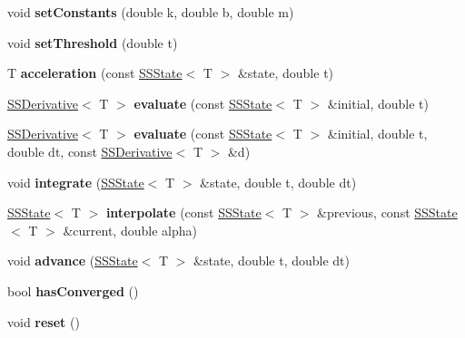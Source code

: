 \begin{DoxyCompactItemize}
void {\bfseries set\+Constants} (double k, double b, double m)
\item 
\mbox{\label{class_p_o_p_1_1_spring_solver_a1456ab3b2007d7baf8c7e19ed11398f4}} 
void {\bfseries set\+Threshold} (double t)
\item 
\mbox{\label{class_p_o_p_1_1_spring_solver_af7d86a44923abf9bf92db308dc217612}} 
T {\bfseries acceleration} (const \mbox{\hyperlink{struct_p_o_p_1_1_s_s_state}{S\+S\+State}}$<$ T $>$ \&state, double t)
\item 
\mbox{\label{class_p_o_p_1_1_spring_solver_a2e2cc9a5a0c9f0181b6e38e2957c0e34}} 
\mbox{\hyperlink{struct_p_o_p_1_1_s_s_derivative}{S\+S\+Derivative}}$<$ T $>$ {\bfseries evaluate} (const \mbox{\hyperlink{struct_p_o_p_1_1_s_s_state}{S\+S\+State}}$<$ T $>$ \&initial, double t)
\item 
\mbox{\label{class_p_o_p_1_1_spring_solver_a11481fb1175c414f34632fec46d7a485}} 
\mbox{\hyperlink{struct_p_o_p_1_1_s_s_derivative}{S\+S\+Derivative}}$<$ T $>$ {\bfseries evaluate} (const \mbox{\hyperlink{struct_p_o_p_1_1_s_s_state}{S\+S\+State}}$<$ T $>$ \&initial, double t, double dt, const \mbox{\hyperlink{struct_p_o_p_1_1_s_s_derivative}{S\+S\+Derivative}}$<$ T $>$ \&d)
\item 
\mbox{\label{class_p_o_p_1_1_spring_solver_a78a0959ade98d12b699617b1aa8ce127}} 
void {\bfseries integrate} (\mbox{\hyperlink{struct_p_o_p_1_1_s_s_state}{S\+S\+State}}$<$ T $>$ \&state, double t, double dt)
\item 
\mbox{\label{class_p_o_p_1_1_spring_solver_a6b63d72b07f26a68160fbaf5220f86e9}} 
\mbox{\hyperlink{struct_p_o_p_1_1_s_s_state}{S\+S\+State}}$<$ T $>$ {\bfseries interpolate} (const \mbox{\hyperlink{struct_p_o_p_1_1_s_s_state}{S\+S\+State}}$<$ T $>$ \&previous, const \mbox{\hyperlink{struct_p_o_p_1_1_s_s_state}{S\+S\+State}}$<$ T $>$ \&current, double alpha)
\item 
\mbox{\label{class_p_o_p_1_1_spring_solver_ac06df8a265f5a3a209f2a84fcc6e08ee}} 
void {\bfseries advance} (\mbox{\hyperlink{struct_p_o_p_1_1_s_s_state}{S\+S\+State}}$<$ T $>$ \&state, double t, double dt)
\item 
\mbox{\label{class_p_o_p_1_1_spring_solver_a1e1bea30a3e7ce42de0521666147e12c}} 
bool {\bfseries has\+Converged} ()
\item 
\mbox{\label{class_p_o_p_1_1_spring_solver_a9b51b8b9f6c7991a2ef0eff842e482ec}} 
void {\bfseries reset} ()
\end{DoxyCompactItemize}


